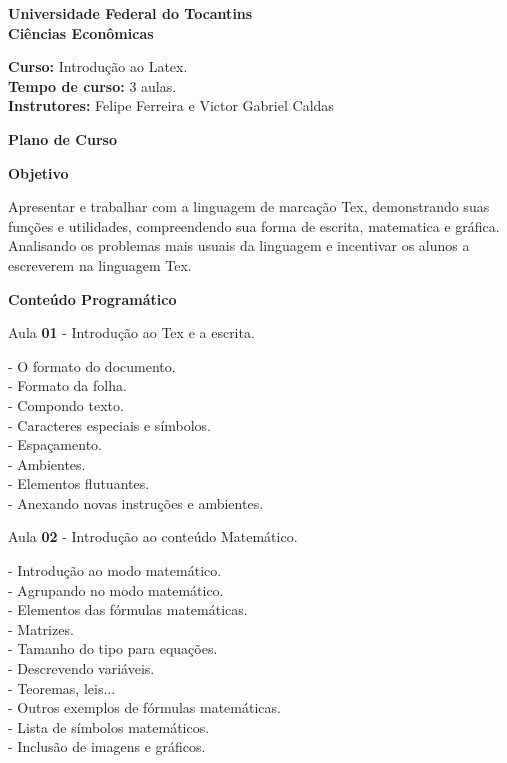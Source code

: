 \documentclass[a4paper, 12pt]{article}
\begin{document}
\begin{center}

\textbf{Universidade Federal do Tocantins}
\\
\textbf{Ciências Econômicas } \onehalfspacing 


\end{center}

\begin{flushleft}
\textbf{Curso:} Introdução ao Latex. 
\\
\textbf{Tempo de curso:} 3 aulas.
\\
\textbf{Instrutores:} Felipe Ferreira e Victor Gabriel Caldas \onehalfspacing

\begin{center}

\textbf{Plano de Curso}
\onehalfspacing
\end{center}

\textbf{Objetivo} \onehalfspacing

Apresentar e trabalhar com a linguagem de marcação Tex, demonstrando suas funções e utilidades, compreendendo sua forma de escrita, matematica e gráfica. Analisando os problemas mais usuais da linguagem e incentivar os alunos a escreverem na linguagem Tex. \singlespacing


\textbf{Conteúdo Programático} \singlespacing

Aula \textbf{01} - Introdução ao Tex e a escrita. \singlespacing

   - O formato do documento.
\\
   - Formato da folha. 
\\
   - Compondo texto.
\\
   - Caracteres especiais e símbolos.
   \\
   - Espaçamento.
   \\
   - Ambientes.
   \\
   - Elementos flutuantes.
   \\
   - Anexando novas instruções e ambientes. \singlespacing
   
Aula \textbf{02} - Introdução ao conteúdo Matemático. \singlespacing

  -  Introdução ao modo matemático.
  \\
  -  Agrupando no modo matemático.
  \\
  - Elementos das fórmulas matemáticas.
  \\
  - Matrizes.
  \\
  - Tamanho do tipo para equações.
  \\
  - Descrevendo variáveis.
  \\
  - Teoremas, leis...
  \\
  - Outros exemplos de fórmulas matemáticas.
  \\
  - Lista de símbolos matemáticos.
  \\
  - Inclusão de imagens e gráficos. \singlespacing
  

\end{flushleft}
\end{document}
